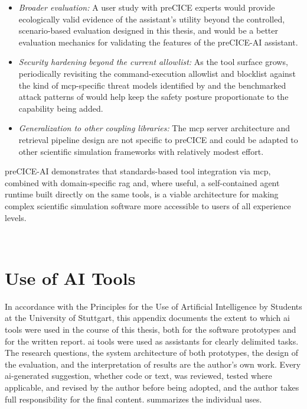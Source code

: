 \documentclass[
  numbers=noenddot,
  english,
  a4paper,
  twoside,
  bibliography=totoc,
  headsepline,
  cleardoublepage=empty,
  parskip=half,
  draft=false
]{scrbook}
\theoremstyle{break}
\renewcommand{\_}{\textunderscore\allowbreak}
\begin{document}
\begin{itemize}
        language model.
  \item \emph{Broader evaluation:} A user study with preCICE experts would provide
        ecologically valid evidence of the assistant's utility beyond the controlled,
        scenario-based evaluation designed in this thesis, and would be a better evaluation mechanics for validating the features of the preCICE-AI assistant.
  \item \emph{Security hardening beyond the current allowlist:} As the tool surface grows,
        periodically revisiting the command-execution allowlist and blocklist against the kind
        of \gls{mcp}-specific threat models identified by \citeauthor{hou2025mcplandscape}
        \cite{hou2025mcplandscape} and the benchmarked attack patterns of
        \citeauthor{wang2025mcptox} \cite{wang2025mcptox} would help keep the safety posture
        proportionate to the capability being added.
  \item \emph{Generalization to other coupling libraries:} The \gls{mcp} server architecture
        and retrieval pipeline design are not specific to preCICE and could be adapted to other
        scientific simulation frameworks with relatively modest effort.
\end{itemize}

preCICE-AI demonstrates that standards-based tool integration via \gls{mcp}, combined with
domain-specific \gls{rag} and, where useful, a self-contained agent runtime built directly on
the same tools, is a viable architecture for making complex scientific simulation software more
accessible to users of all experience levels.



\printbibliography

\ \\


\clearpage
\appendix
{}

\chapter{Use of AI Tools}\label{sec:appendix-ai}

In accordance with the Principles for the Use of Artificial Intelligence by Students at the
University of Stuttgart, this appendix documents the extent to which \gls{ai} tools were used in
the course of this thesis, both for the software prototypes and for the written report.
\gls{ai} tools were used as assistants for clearly delimited tasks.
The research questions, the system architecture of both prototypes, the design of the
evaluation, and the interpretation of results are the author's own work.
Every \gls{ai}-generated suggestion, whether code or text, was reviewed, tested where
applicable, and revised by the author before being adopted, and the author takes full
responsibility for the final content.
 summarizes the individual uses.
\end{document}
